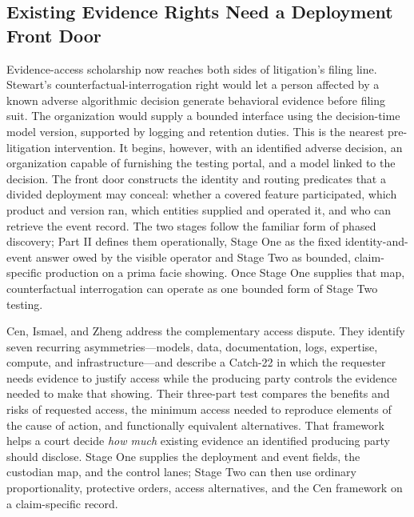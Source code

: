 \subsection{Existing Evidence Rights Need a Deployment Front Door}
\label{sec:adjacent-literature}

Evidence-access scholarship now reaches both sides of litigation's filing line. Stewart's counterfactual-interrogation right would let a person affected by a known adverse algorithmic decision generate behavioral evidence before filing suit. The organization would supply a bounded interface using the decision-time model version, supported by logging and retention duties. This is the nearest pre-litigation intervention. It begins, however, with an identified adverse decision, an organization capable of furnishing the testing portal, and a model linked to the decision. The front door constructs the identity and routing predicates that a divided deployment may conceal: whether a covered feature participated, which product and version ran, which entities supplied and operated it, and who can retrieve the event record. The two stages follow the familiar form of phased discovery; Part II defines them operationally, Stage One as the fixed identity-and-event answer owed by the visible operator and Stage Two as bounded, claim-specific production on a prima facie showing. Once Stage One supplies that map, counterfactual interrogation can operate as one bounded form of Stage Two testing.

Cen, Ismael, and Zheng address the complementary access dispute. They identify seven recurring asymmetries---models, data, documentation, logs, expertise, compute, and infrastructure---and describe a Catch-22 in which the requester needs evidence to justify access while the producing party controls the evidence needed to make that showing. Their three-part test compares the benefits and risks of requested access, the minimum access needed to reproduce elements of the cause of action, and functionally equivalent alternatives. That framework helps a court decide \emph{how much} existing evidence an identified producing party should disclose. Stage One supplies the deployment and event fields, the custodian map, and the control lanes; Stage Two can then use ordinary proportionality, protective orders, access alternatives, and the Cen framework on a claim-specific record.

